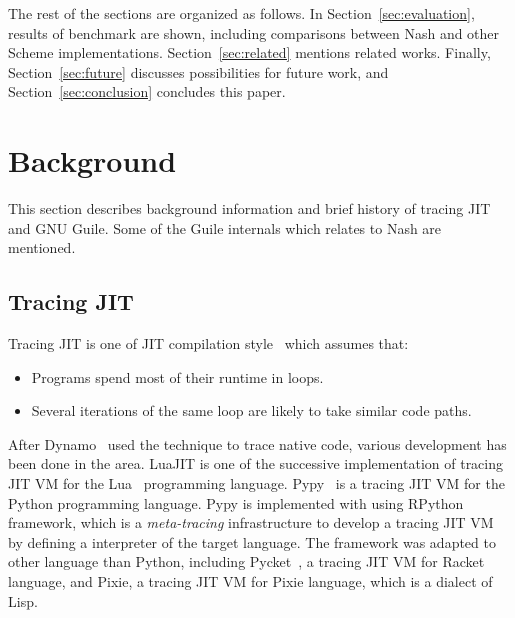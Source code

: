 \documentclass[preprint]{sigplanconf}
\begin{document}
The rest of the sections are organized as follows. In
Section~\hyperref[sec:evaluation]{\ref{sec:evaluation}}, results of benchmark
are shown, including comparisons between Nash and other Scheme
implementations. Section~\hyperref[sec:related]{\ref{sec:related}} mentions
related works. Finally, Section~\hyperref[sec:conclusion]{\ref{sec:future}}
discusses possibilities for future work, and
Section~\hyperref[sec:conclusion]{\ref{sec:conclusion}} concludes this paper.

\section{Background}
\label{sec:background}

This section describes background information and brief history of tracing JIT
and GNU Guile. Some of the Guile internals which relates to Nash are
mentioned.

\subsection{Tracing JIT}
Tracing JIT is one of JIT compilation style~\cite{bolz2009tracing} which
assumes that:

\begin{itemize}
\item Programs spend most of their runtime in loops.
\item Several iterations of the same loop are likely to take similar code
  paths.
\end{itemize}

After Dynamo~\cite{bala2000dynamo} used the technique to trace native code,
various development has been done in the area. LuaJIT is one of the successive
implementation of tracing JIT VM for the Lua~\cite{ierusalimschy1996lua}
programming language. Pypy~\cite{bolz2009tracing} is a tracing JIT VM for the
Python programming language. Pypy is implemented with using
RPython~\cite{bolz2009tracing} framework, which is a \textit{meta-tracing}
infrastructure to develop a tracing JIT VM by defining a interpreter of the
target language. The framework was adapted to other language than Python,
including Pycket~\citep{bauman2015pycket}, a tracing JIT VM for Racket
language, and Pixie, a tracing JIT VM for Pixie language, which is a dialect
of Lisp.
\end{document}
